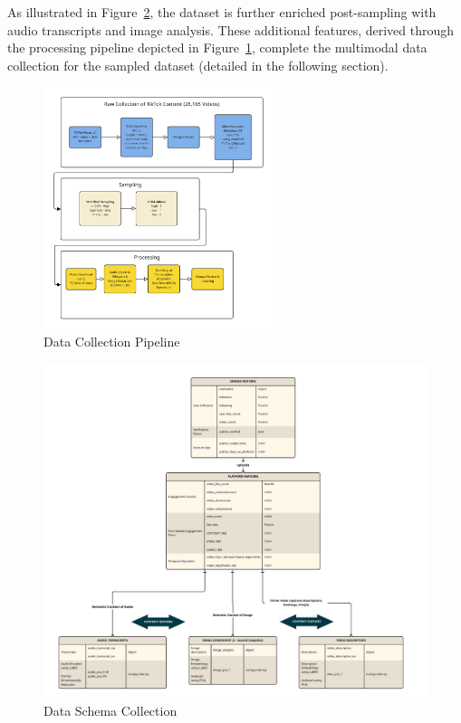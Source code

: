 \documentclass[12pt,a4paper]{report}
\begin{document}
As illustrated in Figure~\ref{fig:data_schema}, the dataset is further enriched post-sampling with audio transcripts and image analysis. These additional features, derived through the processing pipeline depicted in Figure~\ref{fig:data_pipeline}, complete the multimodal data collection for the sampled dataset (detailed in the following section).
\begin{figure}[H]
    \centering
    \includegraphics[width=0.6\textwidth, page=1]{figures/data_collection.pdf}
    \caption{Data Collection Pipeline}
    \label{fig:data_pipeline}
\end{figure}
\begin{figure}[H]
    \centering
    \includegraphics[width=1.0\textwidth, page=1]{figures/data_collection_schema.pdf}
    \caption{Data Schema Collection}
    \label{fig:data_schema}
\end{figure}
\newpage
\end{document}
